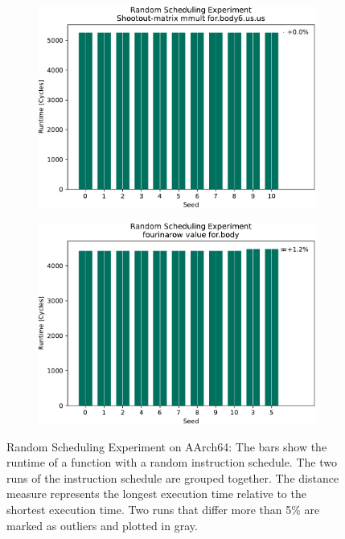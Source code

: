 \begin{figure}
    \vspace{0.5cm}
    \begin{subfigure}{0.0325\textwidth}\caption{}\label{fig:eval:rndm:aarch64:e}\end{subfigure}
    \begin{subfigure}{0.44\textwidth}
        \includegraphics[width=\textwidth]{img/random-scheduling-experiment-pi-collected/Shootout-matrix-crop.pdf}
    \end{subfigure}
    \hfill
    \begin{subfigure}{0.0325\textwidth}\caption{}\label{fig:eval:rndm:aarch64:f}\end{subfigure}
    \begin{subfigure}{0.44\textwidth}
        \includegraphics[width=\textwidth]{img/random-scheduling-experiment-pi-collected/fourinarow-crop.pdf}
    \end{subfigure}

    \caption[Random Scheduling Experiment on AArch64]{Random Scheduling Experiment on AArch64:
    The bars show the runtime of a function with a random instruction schedule.
    The two runs of the instruction schedule are grouped together.
    The distance measure represents the longest execution time relative to the shortest execution time.
    Two runs that differ more than 5\% are marked as outliers and plotted in gray.}
    \label{fig:eval:rndm:aarch64}
\end{figure}

